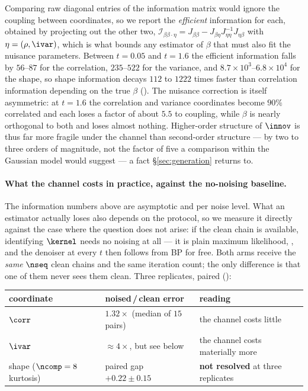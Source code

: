 \documentclass{article}
\begin{document}
Comparing raw diagonal entries of the information matrix would ignore the coupling between
coordinates, so we report the \emph{efficient} information for each, obtained by projecting out
the other two,
$\mathcal I_{\beta\beta\cdot\eta}=J_{\beta\beta}-J_{\beta\eta}J_{\eta\eta}^{-1}J_{\eta\beta}$
with $\eta=(\rho,\ivar)$, which is what bounds any estimator of $\beta$ that must also fit the
nuisance parameters. Between $t=0.05$ and $t=1.6$ the efficient information falls by $56$--$87$
for the correlation, $235$--$522$ for the variance, and $8.7\times10^{3}$--$6.8\times10^{4}$ for
the shape, so shape information decays $112$ to $1222$ times faster than correlation information
depending on the true $\beta$
(). The nuisance correction is itself
asymmetric: at $t=1.6$ the correlation and variance coordinates become $90\%$ correlated and each
loses a factor of about $5.5$ to coupling, while $\beta$ is nearly orthogonal to both and loses
almost nothing. Higher-order structure of $\innov$ is thus far more fragile under the channel
than second-order structure --- by two to three orders of magnitude, not the factor of five a
comparison within the Gaussian model would suggest --- a fact \S\ref{sec:generation} returns to.

\paragraph{What the channel costs in practice, against the no-noising baseline.} The information
numbers above are asymptotic and per noise level. What an estimator actually loses also depends
on the protocol, so we measure it directly against the case where the question does not arise: if
the clean chain is available, identifying $\kernel$ needs no noising at all --- it is plain
maximum likelihood, , and the denoiser at every $t$ then follows from BP
for free. Both arms receive the \emph{same} $\nseq$ clean chains and the same iteration count;
the only difference is that one of them never sees them clean. Three replicates, paired
():

\begin{center}\small
\begin{tabular}{@{}lll@{}}
\toprule
coordinate & noised\,/\,clean error & reading \\
\midrule
$\corr$ & $1.32\times$ (median of $15$ pairs) & the channel costs little \\
$\ivar$ & ${\approx}4\times$, but see below      & the channel costs materially more \\
shape ($\ncomp=8$ kurtosis) & paired gap $+0.22\pm0.15$ & \textbf{not resolved} at three replicates \\
\bottomrule
\end{tabular}
\end{center}
\end{document}
